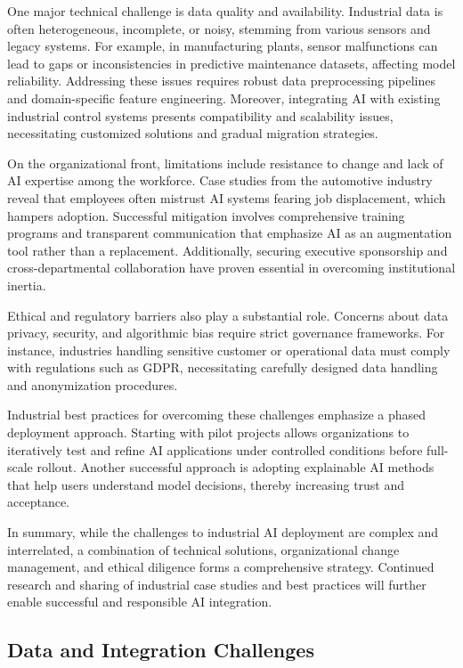 \documentclass[sigconf]{acmart}
\begin{document}
One major technical challenge is data quality and availability. Industrial data is often heterogeneous, incomplete, or noisy, stemming from various sensors and legacy systems. For example, in manufacturing plants, sensor malfunctions can lead to gaps or inconsistencies in predictive maintenance datasets, affecting model reliability. Addressing these issues requires robust data preprocessing pipelines and domain-specific feature engineering. Moreover, integrating AI with existing industrial control systems presents compatibility and scalability issues, necessitating customized solutions and gradual migration strategies.

On the organizational front, limitations include resistance to change and lack of AI expertise among the workforce. Case studies from the automotive industry reveal that employees often mistrust AI systems fearing job displacement, which hampers adoption. Successful mitigation involves comprehensive training programs and transparent communication that emphasize AI as an augmentation tool rather than a replacement. Additionally, securing executive sponsorship and cross-departmental collaboration have proven essential in overcoming institutional inertia.

Ethical and regulatory barriers also play a substantial role. Concerns about data privacy, security, and algorithmic bias require strict governance frameworks. For instance, industries handling sensitive customer or operational data must comply with regulations such as GDPR, necessitating carefully designed data handling and anonymization procedures.

Industrial best practices for overcoming these challenges emphasize a phased deployment approach. Starting with pilot projects allows organizations to iteratively test and refine AI applications under controlled conditions before full-scale rollout. Another successful approach is adopting explainable AI methods that help users understand model decisions, thereby increasing trust and acceptance.

In summary, while the challenges to industrial AI deployment are complex and interrelated, a combination of technical solutions, organizational change management, and ethical diligence forms a comprehensive strategy. Continued research and sharing of industrial case studies and best practices will further enable successful and responsible AI integration.

\subsection{Data and Integration Challenges}
\end{document}
